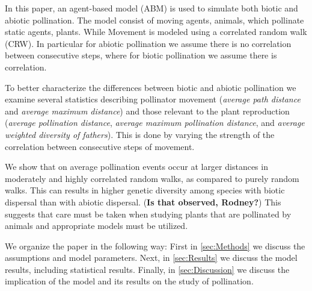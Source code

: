 In this paper, an agent-based model (ABM) is used to simulate both biotic and
abiotic pollination.  The model consist of moving agents, animals, which
pollinate static agents, plants.  While Movement is modeled using a correlated
random walk (CRW).  In particular for abiotic pollination we assume there is no
correlation between consecutive steps, where for biotic pollination we assume
there is correlation.

To better characterize the differences between biotic and abiotic pollination we
examine several statistics describing pollinator movement (\emph{average path
distance} and \emph{average maximum distance}) and those relevant to the plant
reproduction (\emph{average pollination distance}, \emph{average maximum
pollination distance}, and \emph{average weighted diversity of fathers}).  This
is done by varying the strength of the correlation between consecutive steps of
movement.

We show that on average pollination events occur at larger distances in
moderately and highly correlated random walks, as compared to purely random
walks.  This can results in higher genetic diversity among species with biotic
dispersal than with abiotic dispersal. ({\bf Is that observed, Rodney?}) This
suggests that care must be taken when studying plants that are pollinated by
animals and appropriate models must be utilized. 

We organize the paper in the following way: First in \cref{sec:Methods} we
discuss the assumptions and model parameters. Next, in \cref{sec:Results} we
discuss the model results, including statistical results. Finally, in
\cref{sec:Discussion} we discuss the implication of the model and its results
on the study of pollination.
